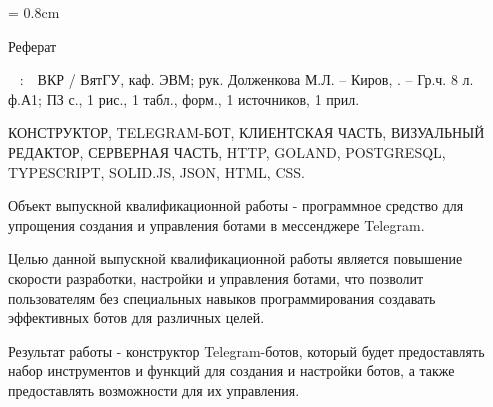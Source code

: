 
{

\topskip = 0.8cm
\begin{center}
	Реферат
\end{center}

\vspace{1em}

\authori\
\topic
:\
\mbox{\tpga}\
ВКР / ВятГУ, каф. ЭВМ; рук.
Долженкова М.Л. – Киров, \the\year. –
Гр.ч. 8 л. ф.А1;
ПЗ
 с.,
1 рис.,
1 табл.,
 форм.,
1 источников,
1 прил.

\vspace{1.5em}

КОНСТРУКТОР,
TELEGRAM-БОТ,
КЛИЕНТСКАЯ ЧАСТЬ,
ВИЗУАЛЬНЫЙ РЕДАКТОР,
СЕРВЕРНАЯ ЧАСТЬ,
HTTP,
GOLAND,
POSTGRESQL,
TYPESCRIPT,
SOLID.JS,
JSON,
HTML,
CSS.

\vspace{1.5em}

Объект выпускной квалификационной работы - программное средство для упрощения
создания и управления ботами в мессенджере Telegram.

Целью данной выпускной квалификационной работы является повышение
скорости разработки, настройки и управления
ботами, что позволит пользователям
без специальных навыков
программирования создавать
эффективных ботов для различных целей.

Результат работы - конструктор Telegram-ботов,
который будет предоставлять
набор инструментов и
функций для создания и настройки
ботов, а также предоставлять
возможности для их управления.

}
